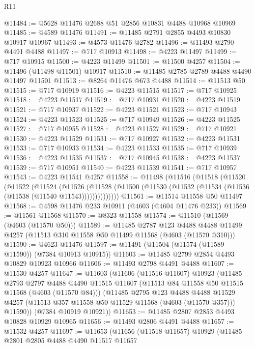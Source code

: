 \begin{lexlean}{R11}
\begin{coremodule}
@11484 := @5628 @11476 @2688 @51 @2856 @10831 @4488 @10968 @10969
@11485 := @4589 @11476
@11491 := @11485 @2791 @2855 @4493 @10830 @10917 @10967
@11493 := @4573 @11476 @2782
@11496 := @11493 @2790 @4491 @4488
@11497 := @717 @10913
@11498 := @4223 @11497
@11499 := @717 @10915
@11500 := @4223 @11499
@11501 := @11500 @4257
@11504 := @11496 (@11498 @11501) @10917
@11510 := @11485 @2785 @2789 @4488 @4490 @11497 @11501
@11513 := @8264 @11476 @673 @4488
@11514 := @11513 @50
@11515 := @717 @10919
@11516 := @4223 @11515
@11517 := @717 @10925
@11518 := @4223 @11517
@11519 := @717 @10931
@11520 := @4223 @11519
@11521 := @717 @10937
@11522 := @4223 @11521
@11523 := @717 @10943
@11524 := @4223 @11523
@11525 := @717 @10949
@11526 := @4223 @11525
@11527 := @717 @10955
@11528 := @4223 @11527
@11529 := @717 @10921
@11530 := @4223 @11529
@11531 := @717 @10927
@11532 := @4223 @11531
@11533 := @717 @10933
@11534 := @4223 @11533
@11535 := @717 @10939
@11536 := @4223 @11535
@11537 := @717 @10945
@11538 := @4223 @11537
@11539 := @717 @10951
@11540 := @4223 @11539
@11541 := @717 @10957
@11543 := @4223 @11541 @4257
@11558 := @11498
    (@11516
      (@11518
        (@11520
          (@11522
            (@11524
              (@11526
                (@11528 (@11500 (@11530 (@11532 (@11534 (@11536 (@11538 (@11540 @11543))))))))))))))
@11561 := @11514 @11558 @50 @11497
@11568 := @4598 @11476 @233 @10911 (@4603 (@4604 @11476 @233))
@11569 := @11561 @11568
@11570 := @8323 @11558
@11574 := @11510 (@11569 (@4603 (@11570 @50)))
@11589 := @11485
    @2787
    @123
    @4488
    @4488
    @11499
    @4257
    (@11513 @310 @11558 @50 @11499 @11568 (@4603 (@11570 @310)))
@11590 := @4623 @11476
@11597 := @11491 (@11504 (@11574 (@11589 @11590)) (@7384 @10913 @10915))
@11603 := @11485 @2799 @2854 @4493 @10829 @10923 @10966
@11606 := @11493 @2798 @4491 @4488
@11607 := @11530 @4257
@11647 := @11603
    (@11606
      (@11516 @11607)
      @10923
      (@11485
        @2793
        @2797
        @4488
        @4490
        @11515
        @11607
        (@11513 @84 @11558 @50 @11515 @11568 (@4603 (@11570 @84)))
        (@11485
          @2795
          @123
          @4488
          @4488
          @11529
          @4257
          (@11513 @357 @11558 @50 @11529 @11568 (@4603 (@11570 @357)))
          @11590))
      (@7384 @10919 @10921))
@11653 := @11485 @2807 @2853 @4493 @10828 @10929 @10965
@11656 := @11493 @2806 @4491 @4488
@11657 := @11532 @4257
@11697 := @11653
    (@11656
      (@11518 @11657)
      @10929
      (@11485
        @2801
        @2805
        @4488
        @4490
        @11517
        @11657

\end{coremodule}
\end{lexlean}
